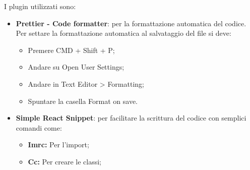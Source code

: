 I plugin utilizzati sono:
\begin{itemize}
	\item \textbf{Prettier - Code formatter}: per la formattazione automatica del codice.
	Per settare la formattazione automatica al salvataggio del file si deve:
	\begin{itemize}
		\item Premere CMD + Shift + P;
		\item Andare su Open User Settings;
		\item Andare in Text Editor > Formatting;
		\item Spuntare la casella Format on save.
	\end{itemize}
	\item \textbf{Simple React Snippet}: per facilitare la scrittura del codice con semplici comandi come:
	\begin{itemize}
		\item \textbf{Imrc:} Per l'import;
		\item \textbf{Cc:} Per creare le classi;
		
	\end{itemize}
\end{itemize}

